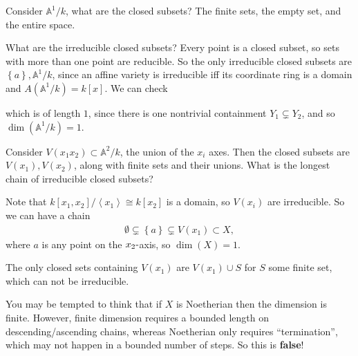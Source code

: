 \begin{example}

Consider \({\mathbb{A}}^1/k\), what are the closed subsets? The finite
sets, the empty set, and the entire space.

What are the irreducible closed subsets? Every point is a closed subset,
so sets with more than one point are reducible. So the only irreducible
closed subsets are \(\left\{{a}\right\}, {\mathbb{A}}^1/k\), since an
affine variety is irreducible iff its coordinate ring is a domain and
\(A({\mathbb{A}}^1/k) = k[x]\). We can check

\begin{center}
\end{center}

which is of length \(1\), since there is one nontrivial containment
\(Y_1 \subsetneq Y_2\), and so \(\dim({\mathbb{A}}^1/k) = 1\).

\end{example}

\begin{example}

Consider \(V(x_1 x_2) \subset {\mathbb{A}}^2/k\), the union of the
\(x_i\) axes. Then the closed subsets are \(V(x_1), V(x_2)\), along with
finite sets and their unions. What is the longest chain of irreducible
closed subsets?

Note that \(k[x_1, x_2] / \left\langle{x_1}\right\rangle \cong k[x_2]\)
is a domain, so \(V(x_i)\) are irreducible. So we can have a chain
\begin{align*}  
\emptyset \subsetneq \left\{{a}\right\} \subsetneq V(x_1) \subset X
,\end{align*}
where \(a\) is any point on the \(x_2{\hbox{-}}\)axis, so
\(\dim(X) = 1\).

The only closed sets containing \(V(x_1)\) are \(V(x_1)\cup S\) for
\(S\) some finite set, which can not be irreducible.

\end{example}

\begin{remark}

You may be tempted to think that if \(X\) is Noetherian then the
dimension is finite. However, finite dimension requires a bounded length
on descending/ascending chains, whereas Noetherian only requires
``termination'', which may not happen in a bounded number of steps. So
this is \textbf{false}!

\end{remark}

